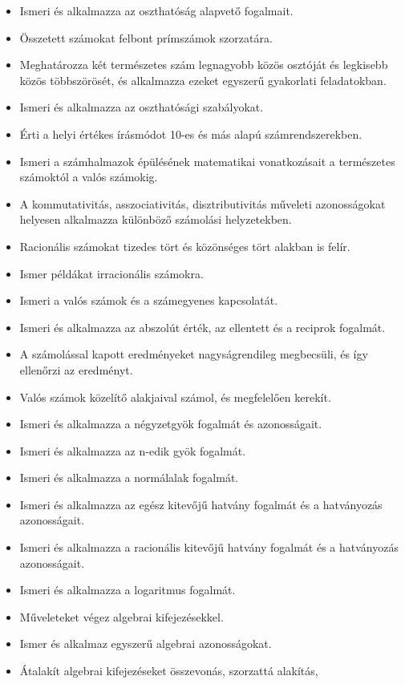 \begin{itemize}
\item
  Ismeri és alkalmazza az oszthatóság alapvető fogalmait.
\item
  Összetett számokat felbont prímszámok szorzatára.
\item
  Meghatározza két természetes szám legnagyobb közös osztóját és
  legkisebb közös többszörösét, és alkalmazza ezeket egyszerű gyakorlati
  feladatokban.
\item
  Ismeri és alkalmazza az oszthatósági szabályokat.
\item
  Érti a helyi értékes írásmódot 10-es és más alapú számrendszerekben.
\item
  Ismeri a számhalmazok épülésének matematikai vonatkozásait a
  természetes számoktól a valós számokig.
\item
  A kommutativitás, asszociativitás, disztributivitás műveleti
  azonosságokat helyesen alkalmazza különböző számolási helyzetekben.
\item
  Racionális számokat tizedes tört és közönséges tört alakban is felír.
\item
  Ismer példákat irracionális számokra.
\item
  Ismeri a valós számok és a számegyenes kapcsolatát.
\item
  Ismeri és alkalmazza az abszolút érték, az ellentett és a reciprok
  fogalmát.
\item
  A számolással kapott eredményeket nagyságrendileg megbecsüli, és így
  ellenőrzi az eredményt.
\item
  Valós számok közelítő alakjaival számol, és megfelelően kerekít.
\item
  Ismeri és alkalmazza a négyzetgyök fogalmát és azonosságait.
\item
  Ismeri és alkalmazza az n-edik gyök fogalmát.
\item
  Ismeri és alkalmazza a normálalak fogalmát.
\item
  Ismeri és alkalmazza az egész kitevőjű hatvány fogalmát és a
  hatványozás azonosságait.
\item
  Ismeri és alkalmazza a racionális kitevőjű hatvány fogalmát és a
  hatványozás azonosságait.
\item
  Ismeri és alkalmazza a logaritmus fogalmát.
\item
  Műveleteket végez algebrai kifejezésekkel.
\item
  Ismer és alkalmaz egyszerű algebrai azonosságokat.
\item
  Átalakít algebrai kifejezéseket összevonás, szorzattá alakítás,

\end{itemize}
